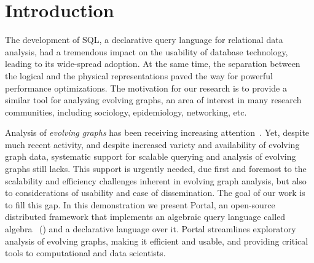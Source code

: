 \section{Introduction}
\label{sec:intro}

The development of SQL, a declarative query language for relational
data analysis, had a tremendous impact on the usability of database
technology, leading to its wide-spread adoption. At the same time, the
separation between the logical and the physical representations paved
the way for powerful performance optimizations. The motivation for our
research is to provide a similar tool for analyzing evolving graphs,
an area of interest in many research communities, including sociology,
epidemiology, networking, etc.





Analysis of {\em evolving graphs} has been receiving increasing
attention~\cite{DBLP:journals/csur/AggarwalS14,Miao2015,Ren2011,Semertzidis2015}.
Yet, despite much recent activity, and despite increased variety and
availability of evolving graph data, systematic support for scalable
querying and analysis of evolving graphs still lacks.  This support is
urgently needed, due first and foremost to the scalability and
efficiency challenges inherent in evolving graph analysis, but also to
considerations of usability and ease of dissemination.  The goal of
our work is to fill this gap.  In this demonstration we present
Portal, an open-source distributed framework that implements an
algebraic query language called \tg algebra~\cite{PortalarXiv2016}
(\tga) and a declarative language \tgql over it. Portal streamlines
exploratory analysis of evolving graphs, making it efficient and
usable, and providing critical tools to computational and data
scientists.

